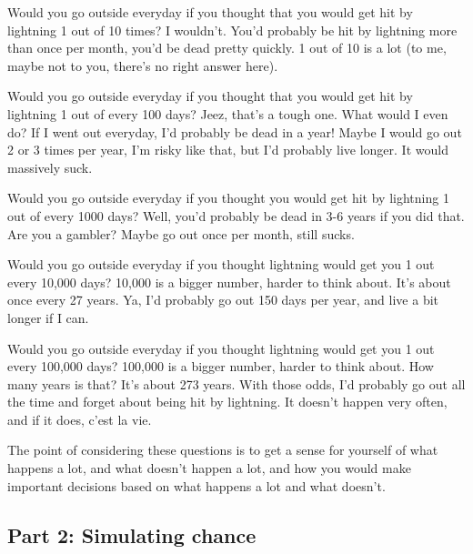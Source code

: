 \documentclass[]{book}
\begin{document}
Would you go outside everyday if you thought that you would get hit by lightning 1 out of 10 times? I wouldn't. You'd probably be hit by lightning more than once per month, you'd be dead pretty quickly. 1 out of 10 is a lot (to me, maybe not to you, there's no right answer here).

Would you go outside everyday if you thought that you would get hit by lightning 1 out of every 100 days? Jeez, that's a tough one. What would I even do? If I went out everyday, I'd probably be dead in a year! Maybe I would go out 2 or 3 times per year, I'm risky like that, but I'd probably live longer. It would massively suck.

Would you go outside everyday if you thought you would get hit by lightning 1 out of every 1000 days? Well, you'd probably be dead in 3-6 years if you did that. Are you a gambler? Maybe go out once per month, still sucks.

Would you go outside everyday if you thought lightning would get you 1 out every 10,000 days? 10,000 is a bigger number, harder to think about. It's about once every 27 years. Ya, I'd probably go out 150 days per year, and live a bit longer if I can.

Would you go outside everyday if you thought lightning would get you 1 out every 100,000 days? 100,000 is a bigger number, harder to think about. How many years is that? It's about 273 years. With those odds, I'd probably go out all the time and forget about being hit by lightning. It doesn't happen very often, and if it does, c'est la vie.

The point of considering these questions is to get a sense for yourself of what happens a lot, and what doesn't happen a lot, and how you would make important decisions based on what happens a lot and what doesn't.

\hypertarget{part-2-simulating-chance}{%
\subsection{Part 2: Simulating chance}\label{part-2-simulating-chance}}
\end{document}
